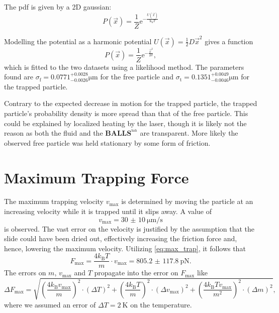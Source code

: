 The pdf is given by a 2D gaussian:
\begin{equation*}
	P(\vec{x}) = \frac{1}{Z} \text{e}^{-\frac{U(\vec{x})}{\text{k}_\text{b} T}}
\end{equation*}

Modelling the potential as a harmonic potential $U(\vec{x}) = \frac{1}{2} D \vec{x}^2$ gives a function
\begin{equation}
	P(\vec{x}) = \frac{1}{Z} \text{e}^{-\frac{\vec{x}^2}{2 \sigma}},
\end{equation}
which is fitted to the two datasets using a likelihood method.
The parameters found are $\sigma_\text{f} = \num{0.0771}^{+0.0028}_{-0.0026}\si{\um}$ for the free particle and $\sigma_\text{t} = \num{0.1351}^{+0.0049}_{-0.0046}\si{\um}$ for the trapped particle.

Contrary to the expected decrease in motion for the trapped particle, the trapped particle's probability density is more spread than that of the free particle.
This could be explained by localized heating by the laser, though it is likely not the reason as both the fluid and the \textbf{BALLS}$^{^\text{hah}}$  are transparent.
More likely the observed free particle was held stationary by some form of friction.

\section{Maximum Trapping Force}
The maximum trapping velocity $v_\text{max}$ is determined by moving the particle at an increasing velocity while it is trapped until it slips away.
A value of
\begin{equation*}
	v_\text{max} = \SI{30(10)}{\micro\meter\per\second}
\end{equation*}
is observed.
The vast error on the velocity is justified by the assumption that the slide could have been dried out, effectively increasing the friction force and, hence, lowering the maximum velocity.
Utilizing \autoref{eq:max_trap}, it follows that
\begin{equation*}
	F_\text{max} = \frac{4k_\text{B}T}{m}\cdot v_\text{max} = \SI{805.2(1178)}{\pico\newton}.	%
\end{equation*}
The errors on $m$, $v_\text{max}$ and $T$ propagate into the error on $F_\text{max}$ like
\begin{equation*}
	\Delta F_\text{max} = \sqrt{\left(\frac{4k_\text{B}v_\text{max}}{m}\right)^2\cdot\left(\Delta T\right)^2 + \left(\frac{4k_\text{B}T}{m}\right)^2\cdot\left(\Delta v_\text{max}\right)^2 + \left(\frac{4k_\text{B}Tv_\text{max}}{m^2}\right)^2\cdot\left(\Delta m\right)^2},
\end{equation*}
where we assumed an error of $\Delta T = \SI{2}{\kelvin}$ on the temperature.


